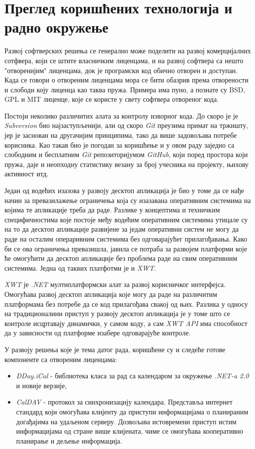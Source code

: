 \chapter{Преглед коришћених технологија и радно окружење}
\label{chap:Pregled koriscenih tehnologija}

Развој софтверских решења се генерално може поделити на развој комерцијалних сотфвера, који се штите власничким лиценцама, и на развој софтвера са нешто "отворенијим" лиценцама, док је програмски код обично отворен и доступан. Када се говори о отвореним лиценцама мора се бити обазрив према отворености и слободи коју лиценца као таква пружа. Примера има пуно, а познате су BSD, GPL и MIT\cite{licence} лиценце, које се користе у свету софтвера отвореног кода.

Постоји неколико различитих алата за контролу изворног кода. До скоро је је \textit{Subversion} био најзаступљенији, али од скоро \textit{Git} преузима примат на тржишту, јер је заснован на другачијим принципима, тако да више задовољава потребе корисника. Као такав био је погодан за коришћење и у овом раду заједно са слободним и бесплатним \textit{Git} репозиторијумом \textit{GitHub}, који поред простора који пружа, даје и неопходну статистику везану за број учесника на пројекту, њихову активност итд.

Један од водећих изазова у развоју десктоп апликација је био у томе да се нађе начин за превазилажење ограничења која су изазавана оперативним системима на којима те апликације треба да раде. Разлике у концептима и техничким специфичностима које постоје међу водећим оперативним системима утицале су на то да десктоп апликације развијене за једам оперативни систем не могу да раде на осталим операривним системима без одговарајућег прилагођавања. Како би се ова ограничења превазишла, јавила се потраба за развојем платформи које ће омогућити да десктоп апликације без проблема раде на свим оперативним системима. Једна од таквих платфотми је и \textit{XWT}.

\textit{XWT}\cite{xwt} је \textit{.NET} мултиплатформски алат за развој корисничког интерфејса. Омогућава развој десктоп апликација које могу да раде на различитим платформама без потребе да се код прилагођава свакој од њих. Разлика у односу на традиционалини приступ у развоју десктоп апликација је у томе што се контроле исцртавају динамички, у самом коду, а сам \textit{XWT API} има способност да у зависности од платформе изабере одговарајуће контроле.

У развоју решења које је тема датог рада, коришћене су и следеће готове компоненте са отвореним лиценцама:
\begin{itemize}
	\item {\textit{DDay.iCal}\cite{dday} - библиотека класа за рад са календаром за окружење \textit{.NET-a 2.0} и новије верзије},
	\item {\textit{CalDAV}\cite{caldav} - протокол за синхронизацију календара. Представља интернет стандард који омогућава клијенту да приступи информацијама о планираним догађајима на удаљеном серверу. Дозвољава истовремени приступ истим информацијама од стране више клијената, чиме се омогућава кооперативно планирање и дељење информација}.
\end{itemize}